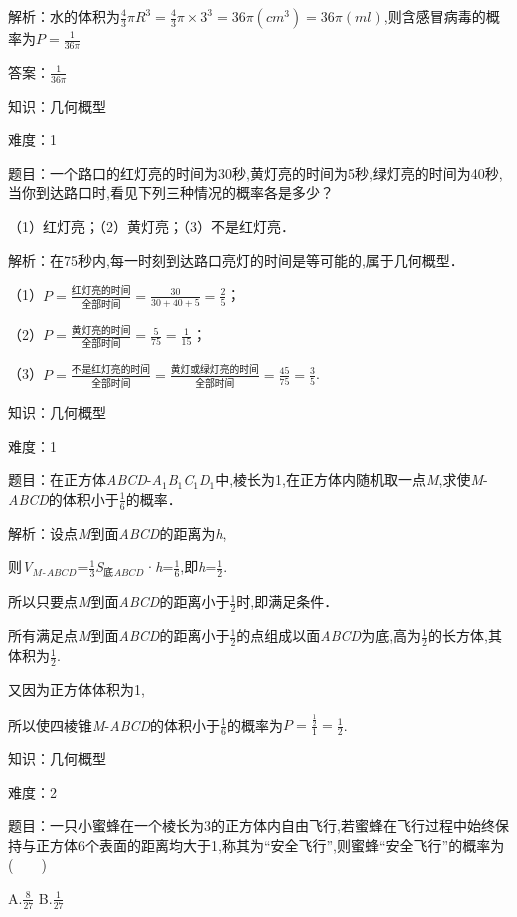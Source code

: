 \documentclass{article} %
\begin{document}
解析：水的体积为$\frac{4}{3}\pi R^3=\frac{4}{3}\pi\times3^3=36\pi(cm^3)=36\pi(ml)$,则含感冒病毒的概率为$P=\frac{1}{36\pi}$

答案：$\frac{1}{36\pi}$

知识：几何概型

难度：1

题目：一个路口的红灯亮的时间为30秒,黄灯亮的时间为5秒,绿灯亮的时间为40秒,当你到达路口时,看见下列三种情况的概率各是多少？

（1）红灯亮；（2）黄灯亮；（3）不是红灯亮．

解析：在75秒内,每一时刻到达路口亮灯的时间是等可能的,属于几何概型．

（1）$P=\frac{\text{红灯亮的时间}}{\text{全部时间}}=\frac{30}{30+40+5}=\frac{2}{5}$；

（2）$P=\frac{\text{黄灯亮的时间}}{\text{全部时间}}=\frac{5}{75}=\frac{1}{15}$；

（3）$P=\frac{\text{不是红灯亮的时间}}{\text{全部时间}}=\frac{\text{黄灯或绿灯亮的时间}}{\text{全部时间}}=\frac{45}{75}=\frac{3}{5}$.

知识：几何概型

难度：1

题目：在正方体\textit{ABCD}-\textit{A}${}_{1}$\textit{B}${}_{1}$\textit{C}${}_{1}$\textit{D}${}_{1}$中,棱长为1,在正方体内随机取一点\textit{M},求使\textit{M}-\textit{ABCD}的体积小于$\frac{1}{6}$的概率．

解析：设点\textit{M}到面\textit{ABCD}的距离为\textit{h},

则\textit{V${}_{M}$}${}_{\textrm{-}}$\textit{${}_{ABCD}$}=$\frac{1}{3}$\textit{S}${}_{\textrm{底}}$\textit{${}_{ABCD}$}·\textit{h}=$\frac{1}{6}$,即\textit{h}=$\frac{1}{2}$.

所以只要点\textit{M}到面\textit{ABCD}的距离小于$\frac{1}{2}$时,即满足条件．

所有满足点\textit{M}到面\textit{ABCD}的距离小于$\frac{1}{2}$的点组成以面\textit{ABCD}为底,高为$\frac{1}{2}$的长方体,其体积为$\frac{1}{2}$.

又因为正方体体积为1,

所以使四棱锥\textit{M}-\textit{ABCD}的体积小于$\frac{1}{6}$的概率为$P=\frac{\frac{1}{2}}{1}=\frac{1}{2}$.

知识：几何概型

难度：2

题目：一只小蜜蜂在一个棱长为3的正方体内自由飞行,若蜜蜂在飞行过程中始终保持与正方体6个表面的距离均大于1,称其为``安全飞行'',则蜜蜂``安全飞行''的概率为(　　)

A.$\frac{8}{27}$  B.$\frac{1}{27}$
\end{document}
